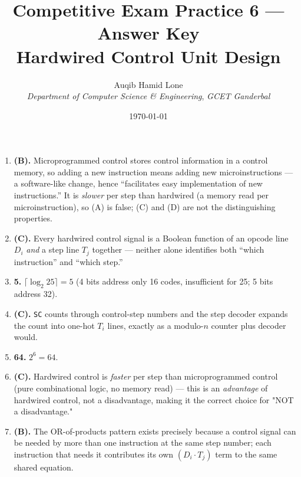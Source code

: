 \documentclass[11pt]{article}
\title{Competitive Exam Practice 6 --- Answer Key\\\large Hardwired Control Unit Design}
\author{Auqib Hamid Lone\\[0.3em]
  \emph{Department of Computer Science \& Engineering}, \emph{GCET Ganderbal}}
\date{\today}
\begin{document}
\maketitle

\begin{enumerate}
\item[\textbf{Q1}] \textbf{(B).} Microprogrammed control stores control information in a control memory, so adding a new instruction means adding new microinstructions --- a software-like change, hence ``facilitates easy implementation of new instructions.'' It is \emph{slower} per step than hardwired (a memory read per microinstruction), so (A) is false; (C) and (D) are not the distinguishing properties.

\item[\textbf{Q2}] \textbf{(C).} Every hardwired control signal is a Boolean function of an opcode line $D_i$ \emph{and} a step line $T_j$ together --- neither alone identifies both ``which instruction'' and ``which step.''

\item[\textbf{Q3}] \textbf{5.} $\lceil \log_2 25 \rceil = 5$ (4 bits address only 16 codes, insufficient for 25; 5 bits address 32).

\item[\textbf{Q4}] \textbf{(C).} \texttt{SC} counts through control-step numbers and the step decoder expands the count into one-hot $T_i$ lines, exactly as a modulo-$n$ counter plus decoder would.

\item[\textbf{Q5}] \textbf{64.} $2^6 = 64$.

\item[\textbf{Q6}] \textbf{(C).} Hardwired control is \emph{faster} per step than microprogrammed control (pure combinational logic, no memory read) --- this is an \emph{advantage} of hardwired control, not a disadvantage, making it the correct choice for "NOT a disadvantage."

\item[\textbf{Q7}] \textbf{(B).} The OR-of-products pattern exists precisely because a control signal can be needed by more than one instruction at the same step number; each instruction that needs it contributes its own $(D_i \cdot T_j)$ term to the same shared equation.
\end{enumerate}
\end{document}
